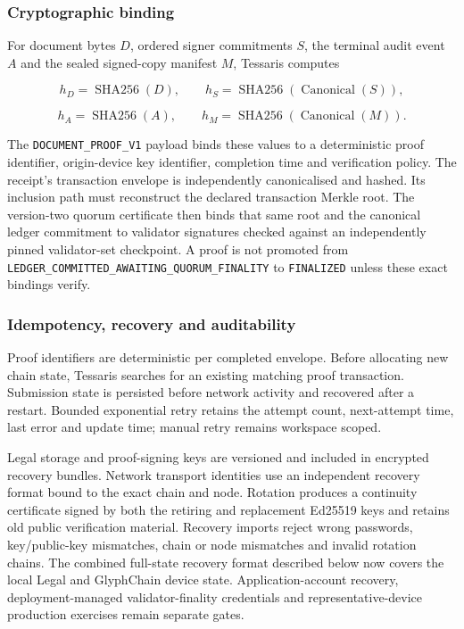 \subsubsection{Cryptographic binding}

For document bytes $D$, ordered signer commitments $S$, the terminal audit
event $A$ and the sealed signed-copy manifest $M$, Tessaris computes

\[
 h_D=\operatorname{SHA256}(D),\qquad
 h_S=\operatorname{SHA256}(\operatorname{Canonical}(S)),
\]

\[
 h_A=\operatorname{SHA256}(A),\qquad
 h_M=\operatorname{SHA256}(\operatorname{Canonical}(M)).
\]

The \texttt{DOCUMENT\_PROOF\_V1} payload binds these values to a deterministic
proof identifier, origin-device key identifier, completion time and verification
policy. The receipt's transaction envelope is independently canonicalised and
hashed. Its inclusion path must reconstruct the declared transaction Merkle root.
The version-two quorum certificate then binds that same root and the canonical
ledger commitment to validator signatures checked against an independently
pinned validator-set checkpoint. A proof is not promoted from
\texttt{LEDGER\_COMMITTED\_AWAITING\_QUORUM\_FINALITY} to
\texttt{FINALIZED} unless these exact bindings verify.

\subsubsection{Idempotency, recovery and auditability}

Proof identifiers are deterministic per completed envelope. Before allocating
new chain state, Tessaris searches for an existing matching proof transaction.
Submission state is persisted before network activity and recovered after a
restart. Bounded exponential retry retains the attempt count, next-attempt time,
last error and update time; manual retry remains workspace scoped.

Legal storage and proof-signing keys are versioned and included in encrypted
recovery bundles. Network transport identities use an independent recovery
format bound to the exact chain and node. Rotation produces a continuity
certificate signed by both the retiring and replacement Ed25519 keys and retains
old public verification material. Recovery imports reject wrong passwords,
key/public-key mismatches, chain or node mismatches and invalid rotation chains.
The combined full-state recovery format described below now covers the local
Legal and GlyphChain device state. Application-account recovery,
deployment-managed validator-finality credentials and representative-device
production exercises remain separate gates.

